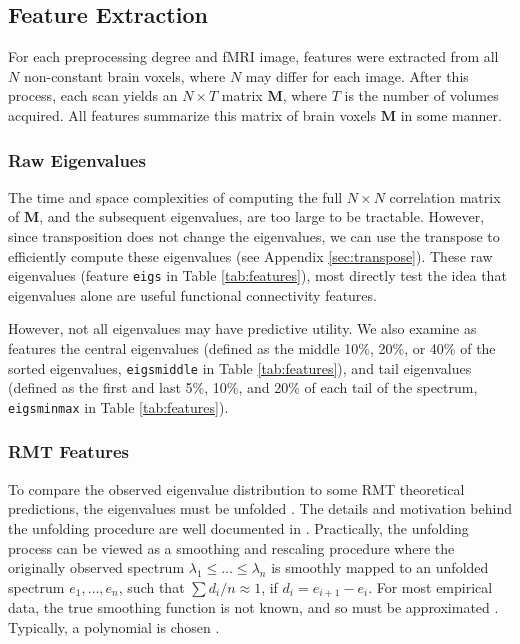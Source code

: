\documentclass[12pt]{spieman}  %
\newcommand{\code}[1]{\small \texttt{#1} \normalsize}
\begin{document}
\begin{spacing}{2}
\subsection{Feature Extraction}


For each preprocessing degree and fMRI image, features were extracted from all
\(N\) non-constant brain voxels, where \(N\) may differ for each image. After
this process, each scan yields an \(N \times T\) matrix \(\mathbf{M}\), where
\(T\) is the number of volumes acquired. All features summarize this matrix
of brain voxels \(\mathbf{M}\) in some manner.

\subsubsection{Raw Eigenvalues}
\label{sec:raw-eigs}

The time and space complexities of computing the full \(N \times N\)
correlation matrix of \(\mathbf{M}\), and the subsequent eigenvalues, are too
large to be tractable. However, since transposition does not change the
eigenvalues, we can use the transpose to efficiently compute these eigenvalues
(see Appendix \ref{sec:transpose}). These raw eigenvalues (feature \code{eigs}
in Table \ref{tab:features}), most directly test the idea that eigenvalues
alone are useful functional connectivity features.

However, not all eigenvalues may have predictive utility. We also examine as
features the central eigenvalues (defined as the middle 10\%, 20\%, or 40\% of
the sorted eigenvalues, \code{eigsmiddle} in Table \ref{tab:features}), and
tail eigenvalues (defined as the first and last 5\%,  10\%, and 20\% of each
tail of the spectrum, \code{eigsminmax} in Table \ref{tab:features}).


\subsubsection{RMT Features}
\label{sec:rmt-features}


To compare the observed eigenvalue distribution to some RMT theoretical
predictions, the eigenvalues must be unfolded
\cite{guhrRandommatrixTheoriesQuantum1998a,mehtaRandomMatrices2004}. The
details and motivation behind the unfolding procedure are well documented in
\cite{guhrRandommatrixTheoriesQuantum1998a}. Practically, the unfolding process
can be viewed as a smoothing and rescaling procedure where the originally
observed spectrum \(\lambda_1 \le \dots \le \lambda_n\) is smoothly mapped to
an unfolded spectrum \(e_1, \dots, e_n\), such that \(\sum d_i/n \approx 1\),
if \(d_i = e_{i+1} - e_i \). For most empirical data, the true smoothing
function is not known, and so must be approximated
\cite{guhrRandommatrixTheoriesQuantum1998a,mehtaRandomMatrices2004}. Typically,
a polynomial is chosen \cite{abul-magdUnfoldingSpectrumChaotic2014}.


\end{spacing}
\end{document}
